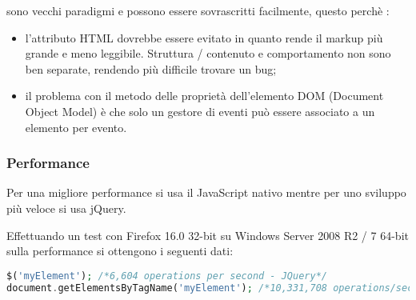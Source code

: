 sono vecchi paradigmi e possono essere sovrascritti facilmente, questo perchè :

\begin{itemize}
\item l'attributo HTML dovrebbe essere evitato in quanto rende il markup più grande e meno leggibile. Struttura / contenuto e comportamento non sono ben separate, rendendo più difficile trovare un bug;

\item il problema con il metodo delle proprietà dell'elemento DOM (Document Object Model) è che solo un gestore di eventi può essere associato a un elemento per evento.
\end{itemize}

\subsubsection{Performance}
Per una migliore performance si usa il JavaScript nativo mentre per uno sviluppo più veloce si usa jQuery. \newline

Effettuando un test con Firefox 16.0 32-bit su Windows Server 2008 R2 / 7 64-bit sulla performance si ottengono i seguenti dati:


\begin{lstlisting}[language=PHP]
$('myElement'); /*6,604 operations per second - JQuery*/
document.getElementsByTagName('myElement'); /*10,331,708 operations/sec - Native Javascript*/
\end{lstlisting}

